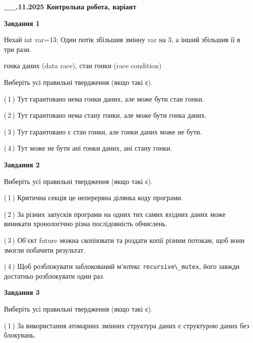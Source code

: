 \documentclass[12pt, ukrainian]{article}
\def\code#1{\Verb!#1!}
\begin{document}
\begin {large}

\textbf{\_\_.11.2025 Контрольна робота, варіант  }\par


{

\begin{center}
\textbf{Завдання 1}
\end{center}
Нехай int var=13; Один потік збільшив змінну var на 3, а інший збільшив її в три рази.

гонка даних (data race), стан гонки (race condition)

Виберіть усі правильні твердження (якщо такі є).\par
\vspace{2mm}
(\,1\,) Тут гарантовано нема гонки даних, але може бути стан гонки.%

(\,2\,) Тут гарантовано нема стану гонки, але може бути гонка даних.%

(\,3\,) Тут гарантовано є стан гонки, але гонки даних може не бути.%

(\,4\,) Тут може не бути ані гонки даних, ані стану гонки.%



\begin{center}
\textbf{Завдання 2}
\end{center}
Виберіть усі правильні твердження (якщо такі є).\par
\vspace{2mm}

(\,1\,) Критична секція це неперервна ділянка коду програми.%

(\,2\,) За різних запусків програми на одних тих самих вхідних даних може виникати хронологічно різна послідовність обчислень.%

(\,3\,) Об’єкт future можна скопіювати та роздати копії різним потокам, щоб вони змогли побачити результат.%

(\,4\,) Щоб розблокувати заблокований м’ютекс \code{recursive\_mutex}, його завжди достатньо розблокувати один раз.%



\begin{center}
\textbf{Завдання 3}
\end{center}
Виберіть усі правильні твердження (якщо такі є).\par
\vspace{2mm}

(\,1\,) За використання атомарних змінних структура даних є структурою даних без блокувань.%

}
\end{large}
\end{document}
